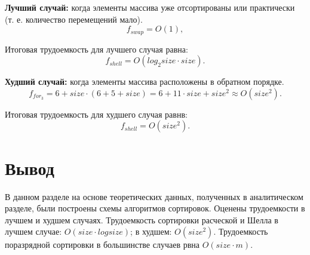\textbf{Лучший случай:} когда элементы массива уже отсортированы или практически (т. е. количество перемещений мало).
\begin{equation}
	f_{swap} = O(1), 
\end{equation}

Итоговая трудоемкость для лучшего случая равна: 
\begin{equation}
	f_{shell} = O(log_2{size} \cdot size).
\end{equation}

\textbf{Худший случай:} когда элементы массива расположены в обратном порядке.
\begin{equation}
	f_{for_{3}} = 6 + size \cdot (6 + 5 + size) = 6 + 11 \cdot size + size^2 \approx O(size^2).
\end{equation}

Итоговая трудоемкость для худшего случая равнв: 
\begin{equation}
	f_{shell} = O(size^2).
\end{equation}

\section*{Вывод}
В данном разделе на основе теоретических данных, полученных в аналитическом разделе, были построены схемы алгоритмов сортировок. 
Оценены трудоемкости в лучшем и худшем случаях. 
Трудоемкость сортировки расческой и Шелла в лучшем случае: $O(size \cdot log{size})$; в худшем: $O(size^2)$.
Трудоемкость поразрядной сортировки в большинстве случаев рвна $O(size \cdot m)$.









